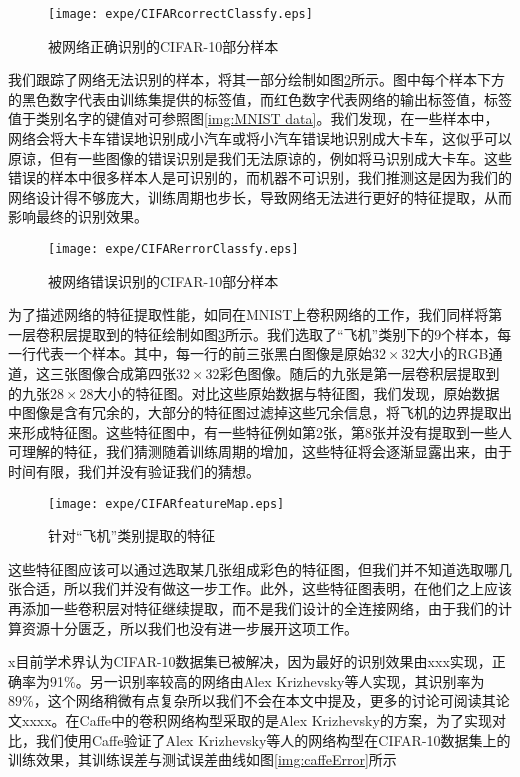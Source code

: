 \begin{figure}[!htbp]
\centering
\texttt{[image: expe/CIFARcorrectClassfy.eps]}
\caption{被网络正确识别的CIFAR-10部分样本}
\label{img:CIFARcorrectClassfy}
\end{figure}

我们跟踪了网络无法识别的样本，将其一部分绘制如图\ref{img:CIFARerrorClassfy}所示。图中每个样本下方的黑色数字代表由训练集提供的标签值，而红色数字代表网络的输出标签值，标签值于类别名字的键值对可参照图\ref{img:MNIST data}。我们发现，在一些样本中，网络会将大卡车错误地识别成小汽车或将小汽车错误地识别成大卡车，这似乎可以原谅，但有一些图像的错误识别是我们无法原谅的，例如将马识别成大卡车。这些错误的样本中很多样本人是可识别的，而机器不可识别，我们推测这是因为我们的网络设计得不够庞大，训练周期也步长，导致网络无法进行更好的特征提取，从而影响最终的识别效果。

\begin{figure}[!htbp]
\centering
\texttt{[image: expe/CIFARerrorClassfy.eps]}
\caption{被网络错误识别的CIFAR-10部分样本}
\label{img:CIFARerrorClassfy}
\end{figure}

为了描述网络的特征提取性能，如同在MNIST上卷积网络的工作，我们同样将第一层卷积层提取到的特征绘制如图\ref{img:CIFARfeatureMap}所示。我们选取了“飞机”类别下的9个样本，每一行代表一个样本。其中，每一行的前三张黑白图像是原始$32\times 32$大小的RGB通道，这三张图像合成第四张$32\times 32$彩色图像。随后的九张是第一层卷积层提取到的九张$28\times 28$大小的特征图。对比这些原始数据与特征图，我们发现，原始数据中图像是含有冗余的，大部分的特征图过滤掉这些冗余信息，将飞机的边界提取出来形成特征图。这些特征图中，有一些特征例如第2张，第8张并没有提取到一些人可理解的特征，我们猜测随着训练周期的增加，这些特征将会逐渐显露出来，由于时间有限，我们并没有验证我们的猜想。


\begin{figure}[!htbp]
\centering
\texttt{[image: expe/CIFARfeatureMap.eps]}
\caption{针对“飞机”类别提取的特征}
\label{img:CIFARfeatureMap}
\end{figure}

这些特征图应该可以通过选取某几张组成彩色的特征图，但我们并不知道选取哪几张合适，所以我们并没有做这一步工作。此外，这些特征图表明，在他们之上应该再添加一些卷积层对特征继续提取，而不是我们设计的全连接网络，由于我们的计算资源十分匮乏，所以我们也没有进一步展开这项工作。

x目前学术界认为CIFAR-10数据集已被解决，因为最好的识别效果由xxx实现，正确率为91\%。另一识别率较高的网络由Alex Krizhevsky等人实现，其识别率为89\%，这个网络稍微有点复杂所以我们不会在本文中提及，更多的讨论可阅读其论文xxxx。在Caffe中的卷积网络构型采取的是Alex Krizhevsky的方案，为了实现对比，我们使用Caffe验证了Alex Krizhevsky等人的网络构型在CIFAR-10数据集上的训练效果，其训练误差与测试误差曲线如图\ref{img:caffeError}所示

